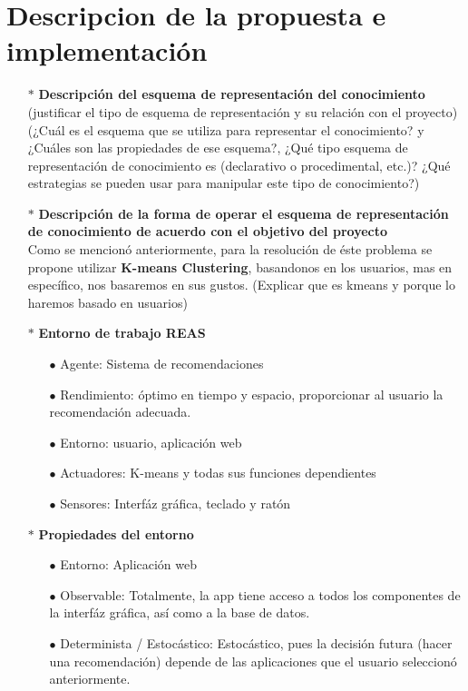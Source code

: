 \documentclass[10pt, a4paper]{article}
\begin{document}
\section{Descripcion de la propuesta e implementaci\'on}
\begin{enumerate}
\item[$\ast$]\textbf{Descripci\'on del esquema de representaci\'on del conocimiento} (justificar el tipo de esquema de representaci\'on y su relaci\'on con el proyecto) (¿Cuál es el esquema que se utiliza para representar el conocimiento? y ¿Cuáles son las propiedades de ese esquema?, ¿Qué tipo esquema de representación de conocimiento es (declarativo o procedimental, etc.)? ¿Qué estrategias se pueden usar para manipular este tipo de conocimiento?)
\item[$\ast$]\textbf{Descripci\'on de la forma de operar el esquema de representaci\'on de conocimiento de acuerdo con el objetivo del proyecto}\\
Como se mencion\'o anteriormente, para la resoluci\'on de \'este problema se propone utilizar \textbf{K-means Clustering}, basandonos en los usuarios, mas en espec\'ifico, nos basaremos en sus gustos. (Explicar que es kmeans y porque lo haremos basado en usuarios)
\item[$\ast$]\textbf{Entorno de trabajo REAS}
\begin{enumerate}
\item[$\bullet$]Agente: Sistema de recomendaciones
\item[$\bullet$]Rendimiento: \'optimo en tiempo y espacio, proporcionar al usuario la recomendaci\'on adecuada.
\item[$\bullet$]Entorno: usuario, aplicaci\'on web
\item[$\bullet$]Actuadores: K-means y todas sus funciones dependientes
\item[$\bullet$]Sensores: Interf\'az gr\'afica, teclado y rat\'on
\end{enumerate}
\item[$\ast$]\textbf{Propiedades del entorno}
\begin{enumerate}
\item[$\bullet$]Entorno: Aplicaci\'on web
\item[$\bullet$]Observable: Totalmente, la app tiene acceso a todos los componentes de la interf\'az gr\'afica, as\'i como a la base de datos.
\item[$\bullet$]Determinista / Estoc\'astico: Estoc\'astico, pues la decisi\'on futura (hacer una recomendaci\'on) depende de las aplicaciones que el usuario seleccion\'o anteriormente. 

\end{enumerate}
\end{enumerate}
\end{document}
